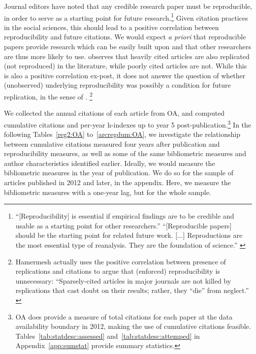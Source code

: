 \documentclass{cje} %
\theoremstyle{plain}%
\theoremstyle{definition}
\theoremstyle{remark}
\begin{document}
Journal editors have noted that any credible research paper must be reproducible, in order to serve as a starting point for future research.\footnote{
	``[Reproducibility] is essential if empirical findings are to be credible and usable as a starting point for other researchers.'' \citep{bernanke2004}
%
	``[Reproducible papers]  should be the starting point for related future work. [...] Reproductions are the most essential type of reanalysis. They are the foundation of science.'' \citep{welch2019c}}
%
Given citation practices in the social sciences, this should lead to a positive correlation between reproducibility and future citations. We would expect \textit{a priori} that reproducible papers provide research which can be easily built upon and that other researchers are thus more likely to use.  \citet{Hamermesh2007} observes that heavily cited articles are also replicated (not reproduced) in the literature, while poorly cited articles are not. While this is also a positive correlation ex-post, it does not answer the question of whether (unobserved) underlying reproducibility was possibly a condition for future replication, in the sense of \citet{bernanke2004}.%
%
\footnote{Hamermesh actually uses the positive correlation between presence of replications and citations to argue that (enforced) reproducibility is unnecessary: 
	``Sparsely-cited articles in major journals
	are not killed by replications that cast doubt on
	their results; rather, they ``die'' from neglect.'' \citep{Hamermesh2017}}
%




We collected the annual citations of each article from OA, and computed cumulative citations and per-year h-indexes up to year 5 post-publication.\footnote{OA does provide a measure of total citations for each paper at the data availability boundary in 2012, making the use of cumulative citations feasible. Tables~\ref{tab:statdesc:assessed} and~\ref{tab:statdesc:attemped} in Appendix~\ref{app:sumstat} provide summary statistics.} 
%
In the following Tables~\ref{reg2:OA} to~\ref{arcregdum:OA}, we investigate the relationship between cumulative citations measured four years after publication and reproducibility measures, as well as some of the same bibliometric measures and author characteristics identified earlier. Ideally, we would measure the bibliometric measures in the year of publication. We do so for the sample of articles published in 2012 and later, in the appendix. Here, we measure the bibliometric measures with a one-year lag, but for the whole sample.
\end{document}
